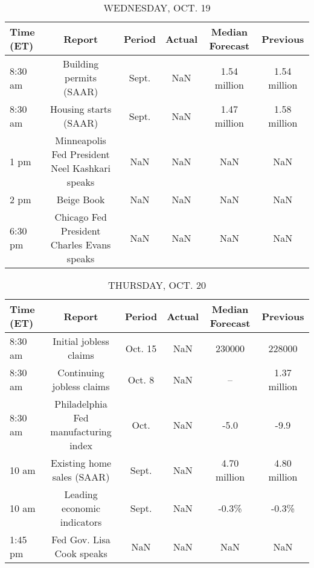 \documentclass{article}%
\begin{document}
\begin{table}[htbp]%
\caption{WEDNESDAY, OCT. 19}%
\centering%
\begin{adjustbox}{width=1\textwidth}%
\begin{tabular}{lccccc}
\toprule
Time (ET) &                                         Report & Period & Actual & Median Forecast &     Previous \\
\midrule
  8:30 am &                        Building permits (SAAR) &  Sept. &    NaN &    1.54 million & 1.54 million \\
  8:30 am &                          Housing starts (SAAR) &  Sept. &    NaN &    1.47 million & 1.58 million \\
     1 pm & Minneapolis Fed President Neel Kashkari speaks &    NaN &    NaN &             NaN &          NaN \\
     2 pm &                                     Beige Book &    NaN &    NaN &             NaN &          NaN \\
  6:30 pm &     Chicago Fed President Charles Evans speaks &    NaN &    NaN &             NaN &          NaN \\
\bottomrule
\end{tabular}
%
\end{adjustbox}%
\end{table}

%


\begin{table}[htbp]%
\caption{THURSDAY, OCT. 20}%
\centering%
\begin{adjustbox}{width=1\textwidth}%
\begin{tabular}{lccccc}
\toprule
Time (ET) &                               Report &  Period & Actual & Median Forecast &     Previous \\
\midrule
  8:30 am &               Initial jobless claims & Oct. 15 &    NaN &          230000 &       228000 \\
  8:30 am &            Continuing jobless claims &  Oct. 8 &    NaN &              -- & 1.37 million \\
  8:30 am & Philadelphia Fed manufacturing index &    Oct. &    NaN &            -5.0 &         -9.9 \\
    10 am &           Existing home sales (SAAR) &   Sept. &    NaN &    4.70 million & 4.80 million \\
    10 am &          Leading economic indicators &   Sept. &    NaN &           -0.3\% &        -0.3\% \\
  1:45 pm &            Fed Gov. Lisa Cook speaks &     NaN &    NaN &             NaN &          NaN \\
\bottomrule
\end{tabular}
%
\end{adjustbox}%
\end{table}
\end{document}
